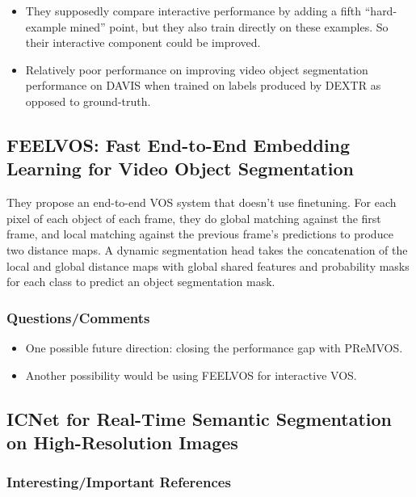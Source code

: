 \documentclass[a4paper, 12pt]{article}
\begin{document}
\begin{itemize}
        \item They supposedly compare interactive performance by adding a fifth
                ``hard-example mined'' point, but they also train directly on
                these examples.
                So their interactive component could be improved.

        \item Relatively poor performance on improving video object
                segmentation performance on DAVIS when trained on labels
                produced by DEXTR as opposed to ground-truth.
\end{itemize}


\subsection{FEELVOS: Fast End-to-End Embedding Learning for Video Object
            Segmentation~\cite{feelvos2019}}

They propose an end-to-end VOS system that doesn't use finetuning.
For each pixel of each object of each frame, they do global matching against
the first frame, and local matching against the previous frame's predictions to
produce two distance maps.
A dynamic segmentation head takes the concatenation of the local and global
distance maps with global shared features and probability masks for each class
to predict an object segmentation mask.


\subsubsection{Questions/Comments}

\begin{itemize}
        \item One possible future direction: closing the performance gap with
                PReMVOS\@.

        \item Another possibility would be using FEELVOS for interactive VOS\@.
\end{itemize}


\subsection{ICNet for Real-Time Semantic Segmentation on High-Resolution
            Images~\cite{zhao2017icnet}}

\subsubsection{Interesting/Important References}
\end{document}
